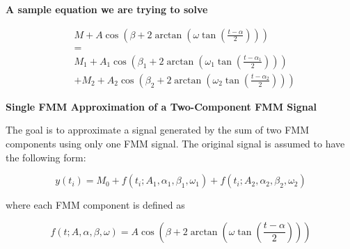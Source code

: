 \documentclass{book}
\providecommand{\ProjectDeepHeading}[2]{%
    \par\medskip\noindent\textbf{#2}\par\smallskip
}
\begin{document}
\ProjectDeepHeading{10}{A sample equation we are trying to solve}
        \[
            \begin{aligned}
                &M
                +
                A\cos\left(
                         \ensuremath{\beta}
                         +
                         2\arctan\left(
                                     \ensuremath{\omega}\tan\left(\frac{t-\ensuremath{\alpha}}{2}\right)
                    \right)
                \right)
                \\
                &=
                \\
                &M_1
                +
                A_1\cos\left(
                           \ensuremath{\beta}_1
                    +
                    2\arctan\left(
                                \ensuremath{\omega}_1\tan\left(\frac{t-\ensuremath{\alpha}_1}{2}\right)
                    \right)
                \right)
                \\
                &+
                M_2
                +
                A_2\cos\left(
                           \ensuremath{\beta}_2
                    +
                    2\arctan\left(
                                \ensuremath{\omega}_2\tan\left(\frac{t-\ensuremath{\alpha}_2}{2}\right)
                    \right)
                \right)
            \end{aligned}
        \]
    
    
    \ProjectDeepHeading{10}{Single FMM Approximation of a Two-Component FMM Signal}
        
        The goal is to approximate a signal generated by the sum of two FMM components using only one FMM signal. The original signal is assumed to have the following form:
        
        \[
            y(t_i)
            =
            M_0
            +
            f(t_i; A_1,\ensuremath{\alpha}_1,\ensuremath{\beta}_1,\ensuremath{\omega}_1)
            +
            f(t_i; A_2,\ensuremath{\alpha}_2,\ensuremath{\beta}_2,\ensuremath{\omega}_2)
        \]
        
        where each FMM component is defined as
        
        \[
            f(t; A,\ensuremath{\alpha},\ensuremath{\beta},\ensuremath{\omega})
            =
            A
            \cos
            \left(
                \ensuremath{\beta}
                +
                2
                \arctan
                \left(
                    \ensuremath{\omega}
                    \tan
                    \left(
                        \frac{t-\ensuremath{\alpha}}{2}
                    \right)
                \right)
            \right)
        \]
        
\end{document}
